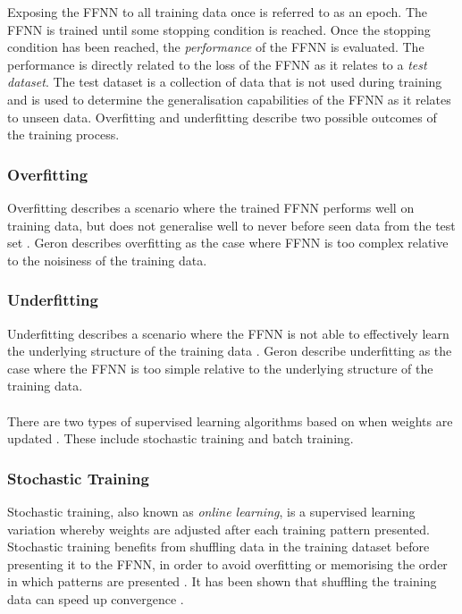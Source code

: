 Exposing the \acs{FFNN} to all training data once is referred to as an
epoch. The \acs{FFNN} is trained until some stopping condition is reached. Once the stopping condition has been reached, the \textit{performance} of the \acs{FFNN} is evaluated. The performance is directly related to the loss of the \acs{FFNN} as it relates to a \textit{test dataset}. The test dataset is a collection of data that is not used during training and is used to determine the generalisation capabilities of the \acs{FFNN} as it relates to unseen data. Overfitting and underfitting describe two possible outcomes of the training process.


\subsubsection{Overfitting}\label{sec:anns:training:process:overfitting}

Overfitting describes a scenario where the trained \acs{FFNN} performs well on training data, but does not generalise well to never before seen data from the test set \cite{ref:tetko:1995, ref:geron:2017}. Geron \cite{ref:geron:2017} describes overfitting as the case where \acs{FFNN} is too complex relative to the noisiness of the training data.

\subsubsection{Underfitting}\label{sec:anns:training:process:underfitting}

Underfitting describes a scenario where the \acs{FFNN} is not able to effectively learn the underlying structure of the training data \cite{ref:tetko:1995, ref:geron:2017}. Geron \cite{ref:geron:2017} describe underfitting as the case where the \acs{FFNN} is too simple relative to the underlying structure of the training data.\\
\\
\noindent
There are two types of supervised learning algorithms based on when weights are updated \cite{ref:engelbrecht:2007}. These include stochastic training and batch
training.


\subsubsection{Stochastic Training}\label{sec:anns:training:stochastic}

Stochastic training, also known as \textit{online learning}, is a supervised learning variation whereby weights are adjusted after each training pattern presented. Stochastic training benefits from shuffling data in the training dataset before presenting it to the \acs{FFNN}, in order to avoid overfitting or memorising the order in which patterns are presented \cite{ref:engelbrecht:2007}. It has been shown that shuffling the training data can speed up convergence
\cite{ref:bengio:2012}.


